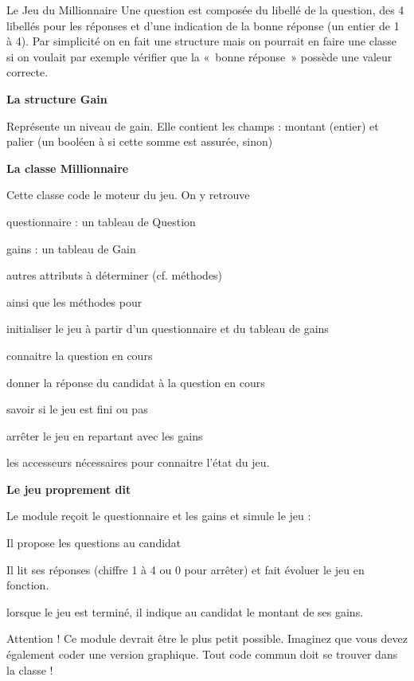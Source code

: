 \begin{Exercice}{Le Jeu du Millionnaire}
	Une question est composée du libellé de la question, des 4 libellés pour
	les réponses et d’une indication de la bonne réponse (un entier de 1 à
	4). Par simplicité on en fait une structure mais on pourrait en faire
	une classe si on voulait par exemple vérifier que la «~bonne réponse~»
	possède une valeur correcte.

	{\bfseries
	La structure Gain}

	Représente un niveau de gain. Elle contient les champs :
	montant (entier) et palier (un booléen à
	 si cette somme est
	assurée,  sinon)

	{\bfseries
	La classe Millionnaire}

	Cette classe code le moteur du jeu. On y retrouve

	\begin{liste}
		\item 
			questionnaire : un tableau de Question
		\item 
			gains : un tableau de Gain
		\item 
			autres attributs à déterminer (cf. méthodes)
	\end{liste}
	
	ainsi que les méthodes pour

	\begin{liste}
		\item 
			initialiser le jeu à partir d’un questionnaire
			et du tableau de gains
		\item 
			connaitre la question en cours
		\item 
			donner la réponse du candidat à la question en
			cours
		\item 
			savoir si le jeu est fini ou pas
		\item 
			arrêter le jeu en repartant avec les gains
		\item 
			les accesseurs nécessaires pour connaitre
			l’état du jeu.
	\end{liste}
	
	{\bfseries
	Le jeu proprement dit}

	Le module  reçoit le
	questionnaire et les gains et simule le jeu :

	\begin{liste}
	\item 
		Il propose les questions au candidat
	\item 
		Il lit ses réponses (chiffre 1 à 4 ou 0 pour
		arrêter) et fait évoluer le jeu en fonction.
	\item 
		lorsque le jeu est terminé, il indique au
		candidat le montant de ses gains.
	\item 
		Attention ! Ce module devrait être le plus
		petit possible. Imaginez que vous devez également coder une version
		graphique. Tout code commun doit se trouver dans la classe
	!
	\end{liste}
\end{Exercice}

